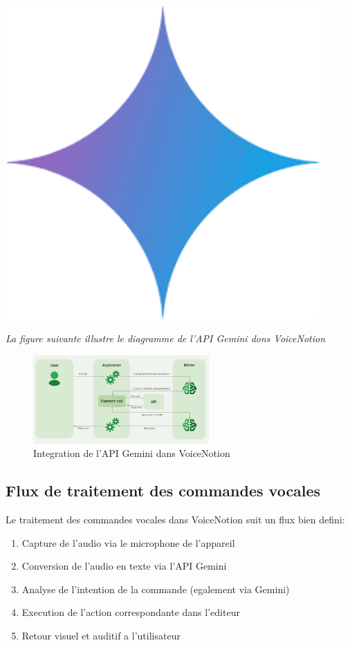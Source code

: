 \begin{minipage}{0.25\textwidth}
\centering
\includegraphics[width=0.9\textwidth]{assets/docs/gemini.png}
\end{minipage}

\noindent
\textit{La figure suivante illustre le diagramme de l'API Gemini dons VoiceNotion}
\begin{figure}[H]
\centering
\includegraphics[width=0.6\textwidth]{assets/docs/golobal-diagrams/gemini-api-diagram.png}
\caption{Integration de l'API Gemini dans VoiceNotion}
\label{fig:gemini-api}
\end{figure}

\subsection{Flux de traitement des commandes vocales}
Le traitement des commandes vocales dans VoiceNotion suit un flux bien defini:
\begin{enumerate}
    \item Capture de l'audio via le microphone de l'appareil
    \item Conversion de l'audio en texte via l'API Gemini
    \item Analyse de l'intention de la commande (egalement via Gemini)
    \item Execution de l'action correspondante dans l'editeur
    \item Retour visuel et auditif a l'utilisateur
\end{enumerate}

